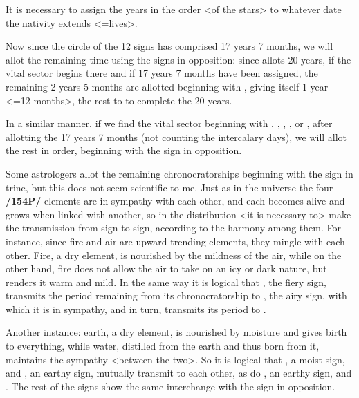 It is necessary to assign the years in the order <of the stars> to whatever date the nativity extends <=lives>.

Now since the circle of the 12 signs has comprised 17 years 7 months, we will allot the remaining time using the signs in opposition: since \Gemini\xspace allots 20 years, if the vital sector begins there and if 17 years 7 months have been assigned, the remaining 2 years 5 months are allotted beginning with \Sagittarius, giving \Sagittarius\xspace itself 1 year <=12 months>, the rest to \Capricorn\xspace to complete the 20 years.

In a similar manner, if we find the vital sector beginning with \Cancer, \Leo, \Virgo, \Capricorn, or \Aquarius, after allotting the 17 years 7 months (not counting the intercalary days), we will allot the rest in order, beginning with the sign in opposition.

Some astrologers allot the remaining chronocratorships beginning with the sign in trine, but this does not seem scientific to me. Just as in the universe the four \textbf{/154P/} elements are in sympathy with each other, and each becomes alive and grows when linked with another, so in the distribution <it is necessary to> make the transmission from sign to sign, according to the harmony among them. For instance, since fire and air are upward-trending elements, they mingle with each other. Fire, a dry element, is nourished
by the mildness of the air, while on the other hand, fire does not allow the air to take on an icy or dark nature, but renders it warm and mild. In the same way it is logical that \Leo, the fiery sign, transmits the period remaining from its chronocratorship to \Aquarius, the airy sign, with which it is in sympathy, and in turn, \Aquarius\xspace transmits its period to \Leo.

Another instance: earth, a dry element, is nourished by moisture and gives birth to everything, while water, distilled from the earth and thus born from it, maintains the sympathy <between the two>. So it is logical that \Cancer, a moist sign, and \Capricorn, an earthy sign, mutually transmit to each other, as do \Virgo, an earthy sign, and \Pisces. The rest of the signs show the same interchange with the sign in opposition. 

